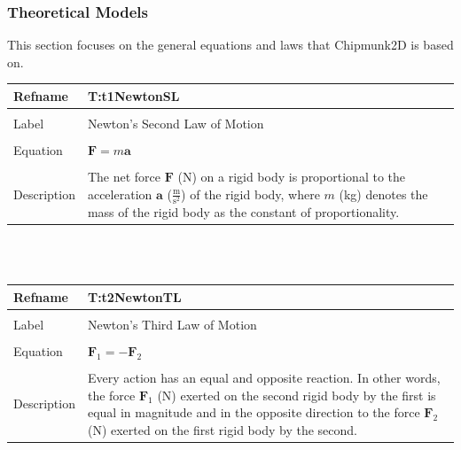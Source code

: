 \documentclass[12pt]{article}
\begin{document}
\subsubsection{Theoretical Models}
\label{Sec:TMs}
This section focuses on the general equations and laws that Chipmunk2D is based on.
~\newline
\noindent \begin{minipage}{\textwidth}
\begin{tabular}{p{} p{}}
\toprule \textbf{Refname} & \textbf{T:t1NewtonSL}
\label{T:t1NewtonSL}
\\ \midrule \\
Label & Newton's Second Law of Motion
\\ \midrule \\
Equation & $\mathbf{F}=m \mathbf{a}$
\\ \midrule \\
Description & The net force $\mathbf{F}$ (N) on a rigid body is proportional to the acceleration $\mathbf{a}$ ($\frac{\text{m}}{\text{s}^{2}}$) of the rigid body, where $m$ (kg) denotes the mass of the rigid body as the constant of proportionality.
\\ \bottomrule \end{tabular}
\end{minipage}\\
~\newline
\noindent \begin{minipage}{\textwidth}
\begin{tabular}{p{} p{}}
\toprule \textbf{Refname} & \textbf{T:t2NewtonTL}
\label{T:t2NewtonTL}
\\ \midrule \\
Label & Newton's Third Law of Motion
\\ \midrule \\
Equation & ${\mathbf{F}_{1}}=-{\mathbf{F}_{2}}$
\\ \midrule \\
Description & Every action has an equal and opposite reaction. In other words, the force ${\mathbf{F}_{1}}$ (N) exerted on the second rigid body by the first is equal in magnitude and in the opposite direction to the force ${\mathbf{F}_{2}}$ (N) exerted on the first rigid body by the second.
\\ \bottomrule \end{tabular}
\end{minipage}\\
~\newline
\end{document}
